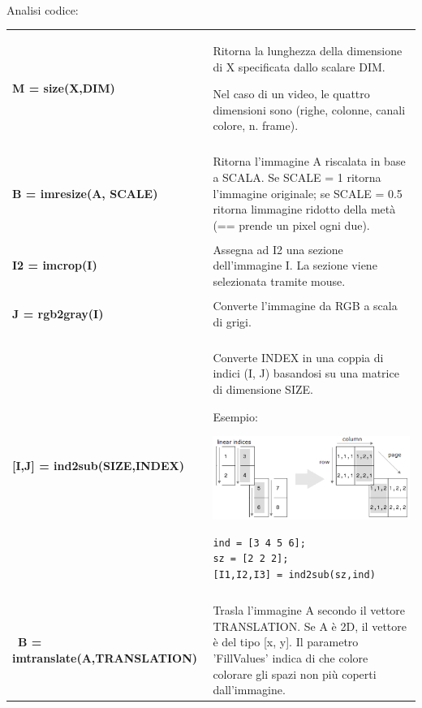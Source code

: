 \documentclass[a4paper, 10pt]{report}
\begin{document}
\noindent \\Analisi codice:
\begin{longtable}{| p{} | p{} |}

\textbf{M = size(X,DIM)} & Ritorna la lunghezza della dimensione di X specificata dallo scalare DIM.

Nel caso di un video, le quattro dimensioni sono (righe, colonne, canali colore, n. frame).
\\\\
\textbf{B = imresize(A, SCALE)} & Ritorna l'immagine A riscalata in base a SCALA.
Se SCALE = 1 ritorna l'immagine originale; se SCALE = 0.5 ritorna limmagine ridotto della metà (== prende un pixel ogni due).
\\\\
\textbf{I2 = imcrop(I)} & Assegna ad I2 una sezione dell'immagine I. La sezione viene selezionata tramite mouse.
\\\\
\textbf{J = rgb2gray(I)} & Converte l'immagine da RGB a scala di grigi.
\\\\
\textbf{[I,J] = ind2sub(SIZE,INDEX)} & Converte INDEX in una coppia di indici (I, J) basandosi su una matrice di dimensione SIZE. 

Esempio:
\begin{center}
\includegraphics[scale=0.5]{ind2sub.pdf}

\lstset{language=matlab}
\begin{lstlisting}
ind = [3 4 5 6];
sz = [2 2 2];
[I1,I2,I3] = ind2sub(sz,ind)
\end{lstlisting}
\end{center}
\\\\\
\textbf{B = imtranslate(A,TRANSLATION)} & Trasla l'immagine A secondo il vettore TRANSLATION. Se A è 2D, il vettore è del tipo [x, y].
Il parametro 'FillValues' indica di che colore colorare gli spazi non più coperti dall'immagine.
\end{longtable}
\end{document}

